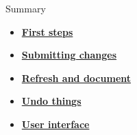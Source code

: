 \documentclass[aspectratio=169]{beamer}
\begin{document}

\begin{frame}{Summary}
  \begin{itemize}
    \item[] \hyperlink{first}{\bf\darkblue First steps}
    \\[4ex]
    \item[] \hyperlink{submit}{\bf\darkblue Submitting changes} \\[4ex]
    \item[] \hyperlink{refresh}{\bf\darkblue Refresh and document}
    \\[4ex]
    \item[] \hyperlink{undo}{\bf\darkblue Undo things} \\[4ex]
    \item[] \hyperlink{ui}{\bf\darkblue User interface}
    \\[1ex]
  \end{itemize}
\end{frame}
\end{document}
